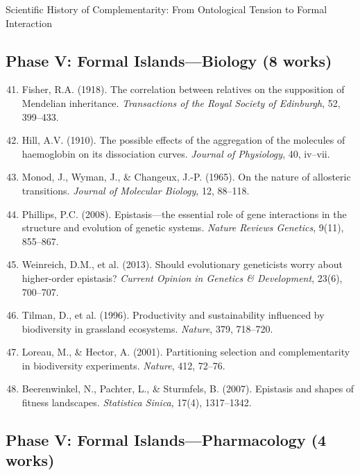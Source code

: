 \begin{chapter}{Scientific History of Complementarity: From Ontological Tension to Formal Interaction}
\subsection{Phase V: Formal Islands---Biology (8 works)}

\begin{enumerate}
    \setcounter{enumi}{40}
    \item Fisher, R.A. (1918). The correlation between relatives on the supposition of Mendelian inheritance. \textit{Transactions of the Royal Society of Edinburgh}, 52, 399--433.

    \item Hill, A.V. (1910). The possible effects of the aggregation of the molecules of haemoglobin on its dissociation curves. \textit{Journal of Physiology}, 40, iv--vii.

    \item Monod, J., Wyman, J., \& Changeux, J.-P. (1965). On the nature of allosteric transitions. \textit{Journal of Molecular Biology}, 12, 88--118.

    \item Phillips, P.C. (2008). Epistasis---the essential role of gene interactions in the structure and evolution of genetic systems. \textit{Nature Reviews Genetics}, 9(11), 855--867.

    \item Weinreich, D.M., et al. (2013). Should evolutionary geneticists worry about higher-order epistasis? \textit{Current Opinion in Genetics \& Development}, 23(6), 700--707.

    \item Tilman, D., et al. (1996). Productivity and sustainability influenced by biodiversity in grassland ecosystems. \textit{Nature}, 379, 718--720.

    \item Loreau, M., \& Hector, A. (2001). Partitioning selection and complementarity in biodiversity experiments. \textit{Nature}, 412, 72--76.

    \item Beerenwinkel, N., Pachter, L., \& Sturmfels, B. (2007). Epistasis and shapes of fitness landscapes. \textit{Statistica Sinica}, 17(4), 1317--1342.
\end{enumerate}

\subsection{Phase V: Formal Islands---Pharmacology (4 works)}


\end{chapter}
